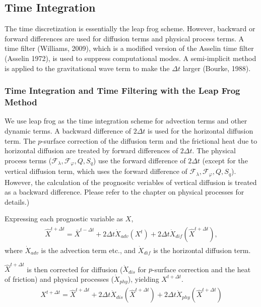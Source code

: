 \hypertarget{time-integration}{%
\subsection{Time Integration}\label{time-integration}}

The time discretization is essentially the leap frog scheme. However, backward or forward differences are used for diffusion terms and physical process terms. A time filter (Williams, 2009), which is
a modified version of the Asselin time filter (Asselin 1972), is used to suppress computational modes. A semi-implicit method is applied to the gravitational wave term to make the \(\Delta t\) larger
(Bourke, 1988).

\hypertarget{time-integration-and-time-filtering-with-leap-frog}{%
\subsubsection{Time Integration and Time Filtering with the Leap Frog Method}\label{time-integration-and-time-filtering-with-leap-frog}}

We use leap frog as the time integration scheme for advection terms and other dynamic terms. A backward difference of \(2 \Delta t\) is used for the horizontal diffusion term. The \(p\)-surface
correction of the diffusion term and the frictional heat due to horizontal diffusion are treated by forward differences of \(2 \Delta t\). The physical process terms
(\({\mathcal F}_\lambda, {\mathcal F}_\varphi, Q, S_q\)) use the forward difference of \(2 \Delta t\) (except for the vertical diffusion term, which uses the forward difference of
\({\mathcal F}_\lambda, {\mathcal F}_\varphi, Q, S_q\)). However, the calculation of the prognositc veriables of vertical diffusion is treated as a backward difference. Please refer to the chapter on
physical processes for details.)

Expressing each prognostic variable as \({X}\), \begin{eqnarray}\begin{aligned}
  \hat{X}^{t+\Delta t}
    =  \bar{X}^{t-\Delta t}
    + 2 \Delta t
      \dot{X}_{adv}\left( {X}^{t} \right)
    + 2 \Delta t
      \dot{X}_{dif}\left( \hat{X}^{t+\Delta t} \right),\end{aligned}\end{eqnarray} where \(\dot{X}_{adv}\) is the advection term etc., and \(\dot{X}_{dif}\) is the horizontal diffusion term.

\(\hat{X}^{t+\Delta t}\) is then corrected for diffusion (\(\dot{X}_{dis}\) for \(p\)-surface correction and the heat of friction) and physical processes (\(\dot{X}_{phy}\)), yielding
\({X}^{t+\Delta t}\). \begin{eqnarray}\begin{aligned}
  {X}^{t+\Delta t}
    =  \hat{X}^{t+\Delta t}
    + 2 \Delta t
      \dot{X}_{dis}\left( \hat{X}^{t+\Delta t} \right)
    + 2 \Delta t
      \dot{X}_{phy}\left( \hat{X}^{t+\Delta t} \right)\end{aligned}\end{eqnarray}


